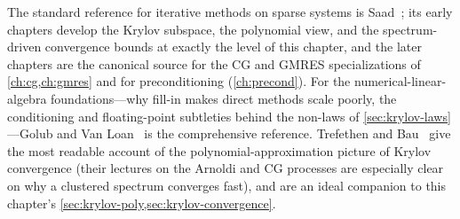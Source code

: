 \furtherreading
The standard reference for iterative methods on sparse systems is
Saad~\citep{saad2003}; its early chapters develop the Krylov subspace, the
polynomial view, and the spectrum-driven convergence bounds at exactly the level of
this chapter, and the later chapters are the canonical source for the CG and GMRES
specializations of \cref{ch:cg,ch:gmres} and for preconditioning
(\cref{ch:precond}). For the numerical-linear-algebra foundations---why fill-in
makes direct methods scale poorly, the conditioning and floating-point subtleties
behind the non-laws of \cref{sec:krylov-laws}---Golub and Van
Loan~\citep{golubvanloan2013} is the comprehensive reference. Trefethen and
Bau~\citep{trefethenbau1997} give the most readable account of the
polynomial-approximation picture of Krylov convergence (their lectures on the
Arnoldi and CG processes are especially clear on why a clustered spectrum converges
fast), and are an ideal companion to this chapter's
\cref{sec:krylov-poly,sec:krylov-convergence}.

